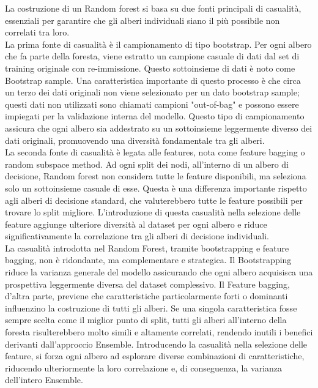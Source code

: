 \documentclass[a4paper,12pt]{report}
\begin{document}
	La costruzione di un Random forest si basa su due fonti principali di casualità, essenziali per garantire che gli alberi individuali siano il più possibile non correlati tra loro. \\
	La prima fonte di casualità è il campionamento di tipo bootstrap. Per ogni albero che fa parte della foresta, viene estratto un campione casuale di dati dal set di training originale con re-immissione. Questo sottoinsieme di dati è noto come Bootstrap sample. Una caratteristica importante di questo processo è che circa un terzo dei dati originali non viene selezionato per un dato bootstrap sample; questi dati non utilizzati sono chiamati campioni "out-of-bag" e possono essere impiegati per la validazione interna del modello. Questo tipo di campionamento assicura che ogni albero sia addestrato su un sottoinsieme leggermente diverso dei dati originali, promuovendo una diversità fondamentale tra gli alberi. \\
	La seconda fonte di casualità è legata alle features, nota come feature bagging o random subspace method. Ad ogni split dei nodi, all'interno di un albero di decisione, Random forest non considera tutte le feature disponibili, ma seleziona solo un sottoinsieme casuale di esse. Questa è una differenza importante rispetto agli alberi di decisione standard, che valuterebbero tutte le feature possibili per trovare lo split migliore. L'introduzione di questa casualità nella selezione delle feature aggiunge ulteriore diversità al dataset per ogni albero e riduce significativamente la correlazione tra gli alberi di decisione individuali. \\
	La casualità introdotta nel Random Forest, tramite bootstrapping e feature bagging, non è ridondante, ma complementare e strategica. Il Bootstrapping riduce la varianza generale del modello assicurando che ogni albero acquisisca una prospettiva leggermente diversa del dataset complessivo. Il Feature bagging, d'altra parte, previene che caratteristiche particolarmente forti o dominanti influenzino la costruzione di tutti gli alberi. Se una singola caratteristica fosse sempre scelta come il miglior punto di split, tutti gli alberi all'interno della foresta risulterebbero molto simili e altamente correlati, rendendo inutili i benefici derivanti dall'approccio Ensemble. Introducendo la casualità nella selezione delle feature, si forza ogni albero ad esplorare diverse combinazioni di caratteristiche, riducendo ulteriormente la loro correlazione e, di conseguenza, la varianza dell'intero Ensemble.
	
\end{document}
